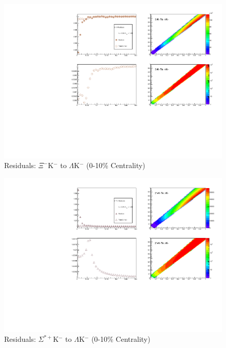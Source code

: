 \documentclass[../AnalysisNoteJBuxton.tex]{subfiles}
\begin{document}
\begin{figure}[h]
  \centering
  \includegraphics[width=\textwidth]{9_AdditionalFigures/Figures/Residuals/LamKchM/Residuals_LamKchM_0010_XiKchM_MomResCrctn_NonFlatBgdCrctn_ResidualsIncluded_UsingCoulombOnlyInterpCfs.pdf}
  \caption[Residuals: $\Xi^{-}$K$^{-}$ to $\Lambda$K$^{-}$ (0-10\% Centrality)]{Residuals: $\Xi^{-}$K$^{-}$ to $\Lambda$K$^{-}$ (0-10\% Centrality)}
  \label{fig:Res_LamKchM_0010_XiCKchM}
\end{figure}


\begin{figure}[h]
  \centering
  \includegraphics[width=\textwidth]{9_AdditionalFigures/Figures/Residuals/LamKchM/Residuals_LamKchM_0010_SigStPKchM_MomResCrctn_NonFlatBgdCrctn_ResidualsIncluded_UsingCoulombOnlyInterpCfs.pdf}
  \caption[Residuals: $\Sigma^{*+}$K$^{-}$ to $\Lambda$K$^{-}$ (0-10\% Centrality)]{Residuals: $\Sigma^{*+}$K$^{-}$ to $\Lambda$K$^{-}$ (0-10\% Centrality)}
  \label{fig:Res_LamKchM_0010_SigStPKchM}
\end{figure}
\end{document}
